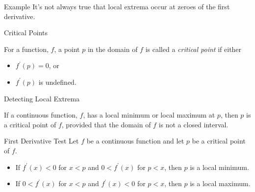 \documentclass[Lecture.tex]{subfiles}
\begin{document}
\begin{frame}{Example}
  It's not always true that local extrema occur at zeroes of the first derivative.
\end{frame}

\begin{frame}{Critical Points}
  \begin{defn}
    For a function, $f$, a point $p$ in the domain of $f$ is called a {\it critical point} if either
    \begin{itemize}[<+->]
    \item
      $f^\prime(p) = 0$, or
    \item
      $f^\prime(p)$ is undefined.
    \end{itemize}
  \end{defn}
\end{frame}

\begin{frame}{Detecting Local Extrema}
  \begin{thm}
    If a continuous function, $f$, has a local minimum or local maximum at $p$, then $p$ is a critical point of $f$, provided that the domain of $f$ is not a closed interval.
  \end{thm}

\end{frame}

\begin{frame}{First Derivative Test}
  Let $f$ be a continuous function and let $p$ be a critical point of $f$.
  \begin{itemize}
  \item<2->
    If $f^\prime(x) < 0$ for $x < p$ and $0 < f^\prime(x)$ for $p < x$, then $p$ is a local minimum.
  \item<3->
    If $0 < f^\prime(x)$ for $x < p$ and $f^\prime(x) < 0$ for $p < x$, then $p$ is a local maximum.
  \end{itemize}
\end{frame}
\end{document}
